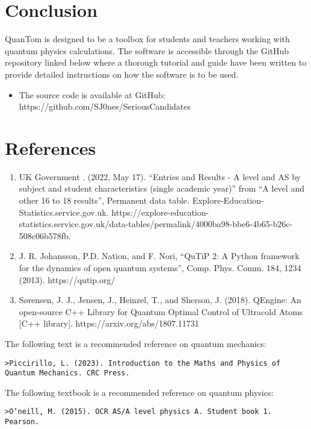\documentclass{article}
\begin{document}
\section{Conclusion}
QuanTom is designed to be a toolbox for students and teachers working with quantum physics calculations. The software is accessible through the GitHub repository linked below where a thorough tutorial and guide have been written to provide detailed instructions on how the software is to be used.  

\begin{itemize}
    \item The source code is available at GitHub: https://github.com/SJ0nes/SeriousCandidates
\end{itemize}

\section{References}
\begin{enumerate}
    \item  UK Government . (2022, May 17). “Entries and Results - A level and AS by subject and student characteristics (single academic year)” from “A level and other 16 to 18 results”, Permanent data table. Explore-Education-Statistics.service.gov.uk. https://explore-education-statistics.service.gov.uk/data-tables/permalink/4000ba98-bbe6-4b65-b26c-508c06b578fb.
    \item J. R. Johansson, P.D. Nation, and F. Nori, “QuTiP 2: A Python framework for the dynamics of open quantum systems”, Comp. Phys. Comm. 184, 1234 (2013). https://qutip.org/ 
    \item Sørensen, J. J., Jensen, J., Heinzel, T., and Sherson, J. (2018). QEngine: An open-source C++ Library for Quantum Optimal Control of Ultracold Atoms [C++ library]. https://arxiv.org/abs/1807.11731

\end{enumerate}

\begin{small}
The following text is a recommended reference on quantum mechanics:
\begin{verbatim}
>Piccirillo, L. (2023). Introduction to the Maths and Physics of Quantum Mechanics. CRC Press.    
\end{verbatim}


The following textbook is a recommended reference on quantum physics:
\begin{verbatim}
>O’neill, M. (2015). OCR AS/A level physics A. Student book 1. Pearson.    
\end{verbatim}
\end{small}
\end{document}
